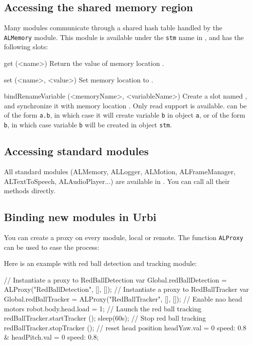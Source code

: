 \subsection{Accessing the \naoqi shared memory region}
Many \naoqi modules communicate through a shared hash table handled by
the \lstinline|ALMemory| module. This module is available under the
\lstinline|stm| name in \urbi, and has the following slots:

\begin{urbiscriptapi}
\item[get](<name>)
  Return the value of memory location .
\item[set](<name>, <value>)
  Set memory location  to .
\item[bindRenameVariable](<memoryName>, <variableName>) Create a \us slot
  named , and synchronize it with memory location
  . Only read support is available.   can
  be of the form \lstinline{a.b}, in which case it will create variable
  \lstinline{b} in object \lstinline{a}, or of the form \lstinline{b}, in
  which case variable \lstinline{b} will be created in object
  \lstinline{stm}.
\end{urbiscriptapi}

\subsection{Accessing standard \naoqi modules}

All standard \naoqi modules (ALMemory, ALLogger, ALMotion, ALFrameManager,
ALTextToSpeech, ALAudioPlayer...) are available in \urbi. You can call all
their methods directly.

\subsection{Binding new \naoqi modules in Urbi}

You can create a proxy on every \naoqi module, local or remote. The function
\lstinline|ALProxy| can be used to ease the process:

Here is an example with red ball detection and tracking module:
\begin{urbiunchecked}
// Instantiate a proxy to RedBallDetection
var Global.redBallDetection = ALProxy("RedBallDetection", [], []);
// Instantiate a proxy to RedBallTracker
var Global.redBallTracker = ALProxy("RedBallTracker", [], []);
// Enable nao head motors
robot.body.head.load = 1;
// Launch the red ball tracking
redBallTracker.startTracker ();
sleep(60s);
// Stop red ball tracking
redBallTracker.stopTracker ();
// reset head position
headYaw.val = 0 speed: 0.8 & headPitch.val = 0 speed: 0.8;
\end{urbiunchecked}

